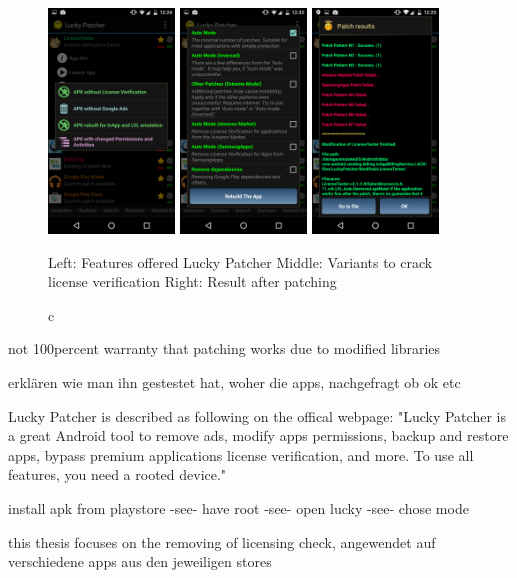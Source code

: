 \begin{figure}[h]
    \centering
    \includegraphics[width=0.3\textwidth]{data/luckyFeatures.png}
    \includegraphics[width=0.3\textwidth]{data/luckyModi.png}
    \includegraphics[width=0.3\textwidth]{data/luckyPatching.png}
    \caption{c}{Left: Features offered Lucky Patcher
    Middle: Variants to crack license verification
    Right: Result after patching}
    \label{fig:luckyScreen}
\end{figure}

not 100percent warranty that patching works due to modified libraries


erklären wie man ihn gestestet hat, woher die apps, nachgefragt ob ok etc

Lucky Patcher is described as following on the offical webpage: "Lucky Patcher is a great Android tool to remove ads, modify apps permissions, backup and restore apps, bypass premium applications license verification, and more. To use all features, you need a rooted device." \cite{luckyPatcherOfficial}

install apk from playstore -see- have root -see- open lucky -see- chose mode


this thesis focuses on the removing of licensing check, angewendet auf verschiedene apps aus den jeweiligen stores
